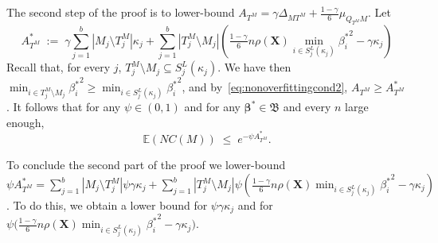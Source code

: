 \documentclass[
  12pt]{article}
\newcommand{\E}{\mathbb{E}}
\newcommand{\bbeta}{\boldsymbol{\beta}}
\newcommand{\bX}{\mathbf{X}}
\newcommand{\bB}{\mathfrak{B}}
\begin{document}
The second step of the proof is to lower-bound $A_{T^M}=\gamma\Delta_{MT^M}+\tfrac{1-\gamma}{6}\mu_{Q_{T^M}M}$. %
Let
$$A_{T^M}^*\;:=\;\gamma\sum_{j=1}^b|M_j \setminus T^M_j|\kappa_j + \sum_{j=1}^b |T^M_j\setminus M_j |\left(\tfrac{1-\gamma}{6} n \rho(\bX) \min_{i\in S_j^{L}(\kappa_j)}{\beta^*_i}^{2} - \gamma\kappa_j\right) $$
Recall that, for every $j$, $T^M_j\setminus M_j\subseteq S_j^{L}(\kappa_j)$. We have then $\min_{i\in T^M_j\setminus M_j}{\beta^*_i}^{2}\geq \min_{i\in S_j^{L}(\kappa_j)}{\beta^*_i}^{2}$, and by~\eqref{eq:nonoverfittingcond2}, $A_{T^M} \geq A_{T^M}^*$. It follows that for any $\psi\in(0,1)$ and for any $\bbeta^*\in\bB$ and every $n$ large enough,
\begin{equation}\label{eq:boundexp2}
    \E(NC(M))\;\leq\;e^{-\psi A_{T^M}^*}.
\end{equation}

To conclude the second part of the proof we lower-bound $\psi A^*_{T^M}=\sum_{j=1}^b|M_j \setminus T^M_j|\psi\gamma\kappa_j + \sum_{j=1}^b |T^M_j \setminus M_j|\psi\left(\tfrac{1-\gamma}{6} n \rho(\bX) \min_{i\in S_j^{L}(\kappa_j)}{\beta^*_i}^{2} - \gamma\kappa_j\right)$. To do this, we obtain a lower bound for $\psi \gamma \kappa_j$ and for $\psi\bigg(\tfrac{1-\gamma}{6} n \rho(\bX) \min_{i\in S_j^{L}(\kappa_j)}{\beta^*_i}^{2} - \gamma\kappa_j\bigg)$.
\end{document}
